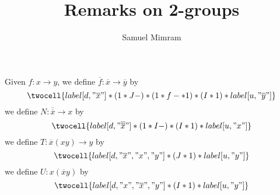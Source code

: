 \documentclass[a4paper]{article}
\title{Remarks on 2-groups}
\author{Samuel Mimram}
\newcommand{\ol}{\overline}
\begin{document}
\maketitle

\noindent
Given $f:x\to y$, we define $\ol f:\ol x\to\ol y$ by
\[
  \twocell{label[d,"\ol x"]*(1*J-)*(1*f-*1)*(I*1)*label[u,"\ol y"]}
\]
we define $N:\ol{\ol x}\to x$ by
\[
  \twocell{label[d,"\ol{\ol x}"]*(1*I-)*(I*1)*label[u,"x"]}
\]
we define $T:\ol x(xy)\to y$ by
\[
  \twocell{label[d,"\ol x","x","y"]*(J*1)*label[u,"y"]}
\]
we define $U:x(\ol xy)$ by
\[
  \twocell{label[d,"x","\ol x","y"]*(I*1)*label[u,"y"]}
\]
\end{document}
